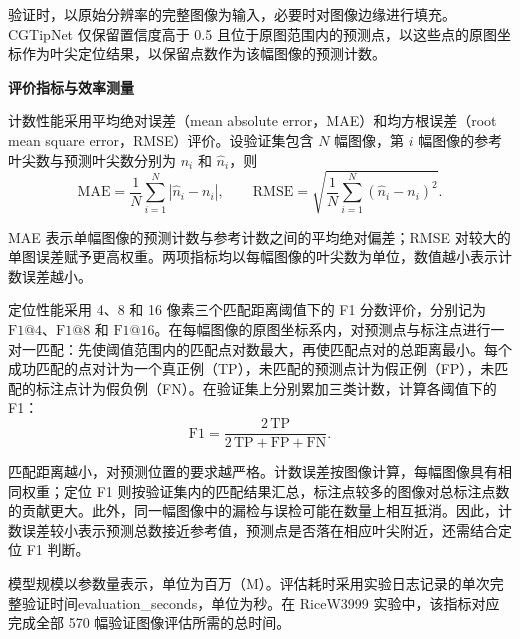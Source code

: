 验证时，以原始分辨率的完整图像为输入，必要时对图像边缘进行填充。CGTipNet 仅保留置信度高于 0.5 且位于原图范围内的预测点，以这些点的原图坐标作为叶尖定位结果，以保留点数作为该幅图像的预测计数。


\par\medskip\noindent\textbf{评价指标与效率测量}\par
计数性能采用平均绝对误差（mean absolute error，MAE）和均方根误差（root mean square error，RMSE）评价。设验证集包含 \(N\) 幅图像，第 \(i\) 幅图像的参考叶尖数与预测叶尖数分别为 \(n_i\) 和 \(\widehat{n}_i\)，则
\begin{equation}
  \mathrm{MAE}
  = \frac{1}{N}\sum_{i=1}^{N}\left|\widehat{n}_i-n_i\right|,
  \qquad
  \mathrm{RMSE}
  = \sqrt{\frac{1}{N}\sum_{i=1}^{N}\left(\widehat{n}_i-n_i\right)^2}.
  \label{eq:cgtipnet-counting-metrics}
\end{equation}

MAE 表示单幅图像的预测计数与参考计数之间的平均绝对偏差；RMSE 对较大的单图误差赋予更高权重。两项指标均以每幅图像的叶尖数为单位，数值越小表示计数误差越小。\par

定位性能采用 4、8 和 16 像素三个匹配距离阈值下的 F1 分数评价，分别记为 \(\mathrm{F1}@4\)、\(\mathrm{F1}@8\) 和 \(\mathrm{F1}@16\)。在每幅图像的原图坐标系内，对预测点与标注点进行一对一匹配：先使阈值范围内的匹配点对数最大，再使匹配点对的总距离最小。每个成功匹配的点对计为一个真正例（TP），未匹配的预测点计为假正例（FP），未匹配的标注点计为假负例（FN）。在验证集上分别累加三类计数，计算各阈值下的 F1：
\begin{equation}
  \mathrm{F1}
  = \frac{2\,\mathrm{TP}}
         {2\,\mathrm{TP}+\mathrm{FP}+\mathrm{FN}}.
  \label{eq:cgtipnet-location-f1}
\end{equation}

匹配距离越小，对预测位置的要求越严格。计数误差按图像计算，每幅图像具有相同权重；定位 F1 则按验证集内的匹配结果汇总，标注点较多的图像对总标注点数的贡献更大。此外，同一幅图像中的漏检与误检可能在数量上相互抵消。因此，计数误差较小表示预测总数接近参考值，预测点是否落在相应叶尖附近，还需结合定位 F1 判断。\par

模型规模以参数量表示，单位为百万（M）。评估耗时采用实验日志记录的单次完整验证时间evaluation\_seconds，单位为秒。在 RiceW3999 实验中，该指标对应完成全部 570 幅验证图像评估所需的总时间。

